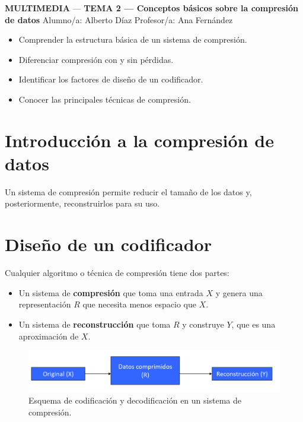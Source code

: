 \documentclass[11pt,a4paper]{article}
\newcommand{\asignatura}{MULTIMEDIA}
\newcommand{\tema}{TEMA 2 — Conceptos básicos sobre la compresión de datos}
\begin{document}
{\large \textbf{\asignatura} \;—\; \textbf{\tema} \hfill}
\faUser\; Alumno/a: Alberto Díaz \hfill
\faChalkboardTeacher\; Profesor/a: Ana Fernández

\vspace{0.6em}

\begin{ObjetivosBox}
\begin{itemize}
	\item Comprender la estructura básica de un sistema de compresión.
	\item Diferenciar compresión con y sin pérdidas.
	\item Identificar los factores de diseño de un codificador.
	\item Conocer las principales técnicas de compresión.
\end{itemize}
\end{ObjetivosBox}

\tableofcontents

\section{Introducción a la compresión de datos}

\begin{DefBox}
Un sistema de compresión permite reducir el tamaño de los datos y, posteriormente, reconstruirlos para su uso.
\end{DefBox}

\section{Diseño de un codificador}

Cualquier algoritmo o técnica de compresión tiene dos partes:

\begin{itemize}
    \item Un sistema de \textbf{compresión} que toma una entrada $X$ y genera una representación $R$ que necesita menos espacio que $X$.
    \item Un sistema de \textbf{reconstrucción} que toma $R$ y construye $Y$, que es una aproximación de $X$.
\end{itemize}

\begin{figure}[!htbp]
    \centering
    \includegraphics[width=0.85\linewidth]{resources/Coder_Decoder.png}
    \caption{Esquema de codificación y decodificación en un sistema de compresión.}
    \label{fig:coder-decoder}
\end{figure}
\end{document}
